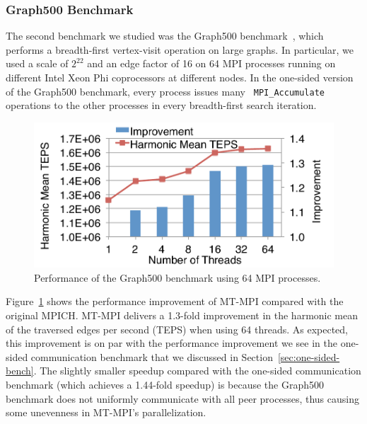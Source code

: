 \subsubsection{Graph500 Benchmark }

The second benchmark we studied was the Graph500
benc\-hmark~\cite{graph500}, which performs a breadth-first vertex-visit
operation on large graphs.  In particular, we used a scale of $2^{22}$
and an edge factor of 16 on 64 MPI processes running on different
Intel Xeon Phi coprocessors at different nodes.  In the one-sided
version of the Graph500 benchmark, every process issues many {\tt
  MPI\_Accumulate} operations to the other processes in every
breadth-first search iteration.

\begin{figure}
\centering
\includegraphics[width=0.8\columnwidth]{figures/mtmpi/eva-stp-ib-graph500.pdf}
\vspace{-2.0ex}
\caption{Performance of the Graph500 benchmark using 64 MPI processes.}\label{fig:eva-graph500-mean-time}
\vspace{-3.0ex}
\end{figure}

Figure~\ref{fig:eva-graph500-mean-time} shows the performance
improvement of MT-MPI compared with the original MPICH.  MT-MPI
delivers a 1.3-fold improvement in the harmonic mean of the traversed
edges per second (TEPS) when using 64 threads.  As expected, this
improvement is on par with the performance improvement we see in the
one-sided communication benchmark that we discussed in
Section~\ref{sec:one-sided-bench}.  The slightly smaller speedup
compared with the one-sided communication benchmark (which achieves a
1.44-fold speedup) is because the Graph500 benchmark does not
uniformly communicate with all peer processes, thus causing some
unevenness in MT-MPI's parallelization.


